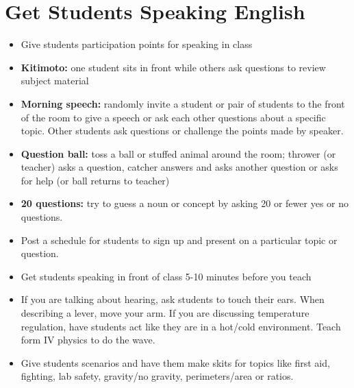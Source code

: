 \begin{center}
\setlength{\fboxsep}{0pt} \setlength{\fboxrule}{2pt} \fbox{} 
\par\end{center}


\section{Get Students Speaking English}
\begin{itemize}
\item Give students participation points for speaking in class 
\item \textbf{Kitimoto:} one student sits in front while others ask questions
to review subject material 
\item \textbf{Morning speech:} randomly invite a student or pair of students
to the front of the room to give a speech or ask each other questions
about a specific topic. Other students ask questions or challenge
the points made by speaker. 
\item \textbf{Question ball:} toss a ball or stuffed animal around the room;
thrower (or teacher) asks a question, catcher answers and asks another
question or asks for help (or ball returns to teacher) 
\item \textbf{20 questions:} try to guess a noun or concept by asking 20
or fewer yes or no questions. 
\item Post a schedule for students to sign up and present on a particular
topic or question.  
\item Get students speaking in front of class 5-10 minutes before you teach 
\item If you are talking about hearing, ask students to touch their ears.
When describing a lever, move your arm. If you are discussing temperature
regulation, have students act like they are in a hot/cold environment.
Teach form IV physics to do the wave.
\item Give students scenarios and have them make skits for topics like first
aid, fighting, lab safety, gravity/no gravity, perimeters/area or
ratios. 
\end{itemize}

